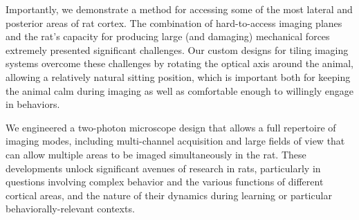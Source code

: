 Importantly, we demonstrate a method for accessing some of the most lateral and posterior areas of rat cortex. The combination of hard-to-access imaging planes and the rat's capacity for producing large (and damaging) mechanical forces extremely presented significant challenges. Our custom designs for tiling imaging systems overcome these challenges by rotating the optical axis around the animal, allowing a relatively natural sitting position, which is important both for keeping the animal calm during imaging as well as comfortable enough to willingly engage in behaviors. 

We engineered a two-photon microscope design that allows a full repertoire of imaging modes, including multi-channel acquisition and large fields of view that can allow multiple areas to be imaged simultaneously in the rat. These developments unlock significant avenues of research in rats, particularly in questions involving complex behavior and the various functions of different cortical areas, and the nature of their dynamics during learning or particular behaviorally-relevant contexts. 





